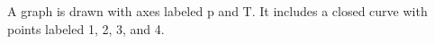 A graph is drawn with axes labeled p and T. It includes a closed curve with points labeled 1, 2, 3, and 4.